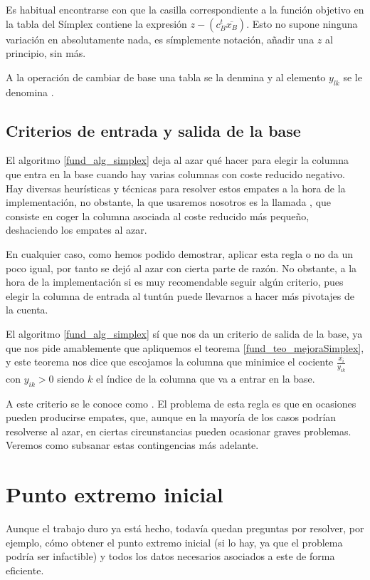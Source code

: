 \begin{obs}[Notación]
	Es habitual encontrarse con que la casilla correspondiente a la función objetivo en la tabla del Símplex contiene la expresión $z-(c_B^t\overline{x_B})$. Esto no supone ninguna variación en absolutamente nada, es símplemente notación, añadir una $z$ al principio, sin más.
\end{obs}

A la operación de cambiar de base una tabla se la denmina  y al elemento $y_{lk}$ se le denomina .

\subsection{Criterios de entrada y salida de la base}
El algoritmo \ref{fund_alg_simplex} deja al azar qué hacer para elegir la columna que entra en la base cuando hay varias columnas con coste reducido negativo. Hay diversas heurísticas y técnicas para resolver estos empates a la hora de la implementación, no obstante, la que usaremos nosotros es la llamada , que consiste en coger la columna asociada al coste reducido más pequeño, deshaciendo los empates al azar.

En cualquier caso, como hemos podido demostrar, aplicar esta regla o no da un poco igual, por tanto se dejó al azar con cierta parte de razón. No obstante, a la hora de la implementación si es muy recomendable seguir algún criterio, pues elegir la columna de entrada al tuntún puede llevarnos a hacer más pivotajes de la cuenta.

El algoritmo \ref{fund_alg_simplex} sí que nos da un criterio de salida de la base, ya que nos pide amablemente que apliquemos el teorema \ref{fund_teo_mejoraSimplex}, y este teorema nos dice que escojamos la columna que minimice el cociente $\frac{\overline{x_i}}{y_{ik}}$ con $y_{ik}>0$ siendo $k$ el índice de la columna que va a entrar en la base.

A este criterio se le conoce como . El problema de esta regla es que en ocasiones pueden producirse empates, que, aunque en la mayoría de los casos podrían resolverse al azar, en ciertas circunstancias pueden ocasionar graves problemas. Veremos como subsanar estas contingencias más adelante.
\section{Punto extremo inicial}
Aunque el trabajo duro ya está hecho, todavía quedan preguntas por resolver, por ejemplo, cómo obtener el punto extremo inicial (si lo hay, ya que el problema podría ser infactible) y todos los datos necesarios asociados a este de forma eficiente.
